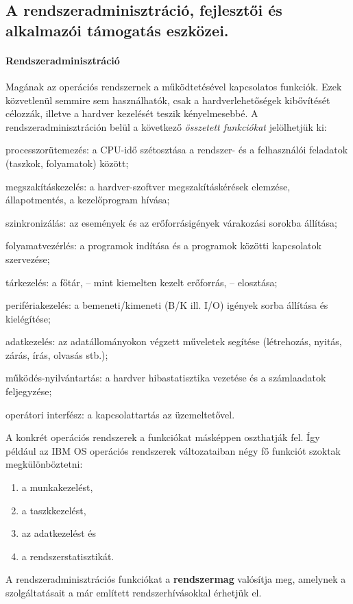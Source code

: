 \subsection{A rendszeradminisztráció, fejlesztői és alkalmazói támogatás eszközei.}
\paragraph{Rendszeradminisztráció}
Magának az operációs rendszernek a működtetésével kapcsolatos funkciók. Ezek közvetlenül semmire sem használhatók, csak a hardverlehetőségek kibővítését célozzák, illetve a hardver kezelését teszik kényelmesebbé. A rendszeradminisztráción belül a következő \emph{összetett funkciókat} jelölhetjük ki:
\begin{enumdescript}[nosep]
	\item[processzorütemezés:] a CPU-idő szétosztása a rendszer- és a felhasználói feladatok
	(taszkok, folyamatok) között;
	\item[megszakításkezelés:] a hardver-szoftver megszakításkérések elemzése, állapotmentés,
	a kezelőprogram hívása;
	\item[szinkronizálás:] az események és az erőforrásigények várakozási sorokba állítása;
	\item[folyamatvezérlés:] a programok indítása és a programok közötti kapcsolatok
	szervezése;
	\item[tárkezelés:] a főtár, -- mint kiemelten kezelt erőforrás, -- elosztása;
	\item[perifériakezelés:] a bemeneti/kimeneti (B/K ill. I/O) igények sorba állítása és
	kielégítése;
	\item[adatkezelés:] az adatállományokon végzett műveletek segítése (létrehozás, nyitás,
	zárás, írás, olvasás stb.);
	\item[működés-nyilvántartás:] a hardver hibastatisztika vezetése és a számlaadatok
	feljegyzése;
	\item[operátori interfész:] a kapcsolattartás az üzemeltetővel.
\end{enumdescript}
A konkrét operációs rendszerek a funkciókat másképpen oszthatják fel. Így például az IBM OS operációs rendszerek változataiban négy fő funkciót szoktak megkülönböztetni:
\begin{enumerate}[nosep]
	\item a munkakezelést,
	\item a taszkkezelést,
	\item az adatkezelést és
	\item a rendszerstatisztikát.
\end{enumerate}
A rendszeradminisztrációs funkciókat a \textbf{rendszermag} valósítja meg, amelynek a szolgáltatásait a már említett rendszerhívásokkal érhetjük el.

